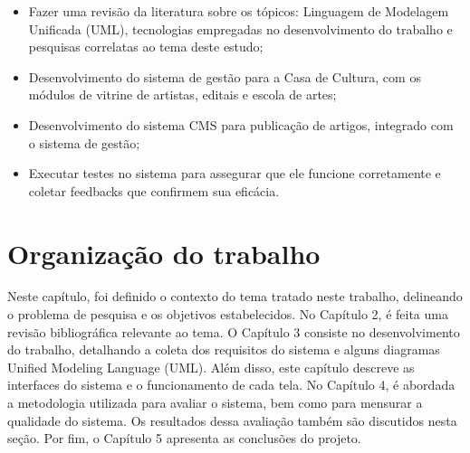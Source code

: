 \begin{itemize}
	\item Fazer uma revisão da literatura sobre os tópicos: Linguagem de Modelagem Unificada (\ac{UML}), tecnologias empregadas no desenvolvimento do trabalho e pesquisas correlatas ao tema deste estudo;
	\item Desenvolvimento do sistema de gestão para a Casa de Cultura, com os módulos de vitrine de artistas, editais e escola de artes;
	\item Desenvolvimento do sistema CMS para publicação de artigos, integrado com o sistema de gestão;
	\item Executar testes no sistema para assegurar que ele funcione corretamente e coletar feedbacks que confirmem sua eficácia.
\end{itemize}

\section{Organização do trabalho}

Neste capítulo, foi definido o contexto do tema tratado neste trabalho, delineando o problema de pesquisa e os objetivos estabelecidos. No Capítulo 2, é feita uma revisão bibliográfica relevante ao tema. O Capítulo 3 consiste no desenvolvimento do trabalho, detalhando a coleta dos requisitos do sistema e alguns diagramas Unified Modeling Language (\ac{UML}). Além disso, este capítulo descreve as interfaces do sistema e o funcionamento de cada tela. No Capítulo 4, é abordada a metodologia utilizada para avaliar o sistema, bem como para mensurar a qualidade do sistema. Os resultados dessa avaliação também são discutidos nesta seção. Por fim, o Capítulo 5 apresenta as conclusões do projeto.
